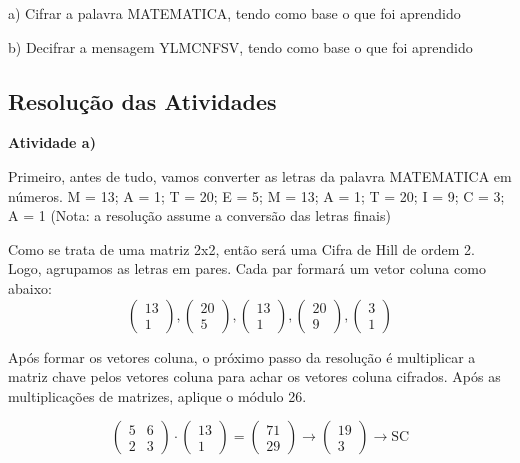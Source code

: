 \documentclass[a4paper,12pt,twocolumn]{article}
\begin{document}
a) Cifrar a palavra MATEMATICA, tendo como base o que foi aprendido

b) Decifrar a mensagem YLMCNFSV, tendo como base o que foi aprendido

\subsection{Resolução das Atividades}
\textbf{Atividade a)}

Primeiro, antes de tudo, vamos converter as letras da palavra MATEMATICA em números.
M = 13; A = 1; T = 20; E = 5; M = 13; A = 1; T = 20; I = 9; C = 3; A = 1 (Nota: a resolução assume a conversão das letras finais)

Como se trata de uma matriz 2x2, então será uma Cifra de Hill de ordem 2. Logo, agrupamos as letras em pares. Cada par formará um vetor coluna como abaixo:
\begin{equation}
\begin{pmatrix} 13 \\ 1 \end{pmatrix}, \begin{pmatrix} 20 \\ 5 \end{pmatrix}, \begin{pmatrix} 13 \\ 1 \end{pmatrix}, \begin{pmatrix} 20 \\ 9 \end{pmatrix}, \begin{pmatrix} 3 \\ 1 \end{pmatrix}
\end{equation}

Após formar os vetores coluna, o próximo passo da resolução é multiplicar a matriz chave pelos vetores coluna para achar os vetores coluna cifrados. Após as multiplicações de matrizes, aplique o módulo 26.

\begin{equation}
\begin{pmatrix} 5 & 6 \\ 2 & 3 \end{pmatrix} \cdot \begin{pmatrix} 13 \\ 1 \end{pmatrix} = \begin{pmatrix} 71 \\ 29 \end{pmatrix} \rightarrow \begin{pmatrix} 19 \\ 3 \end{pmatrix} \rightarrow \text{SC}
\end{equation}
\end{document}
